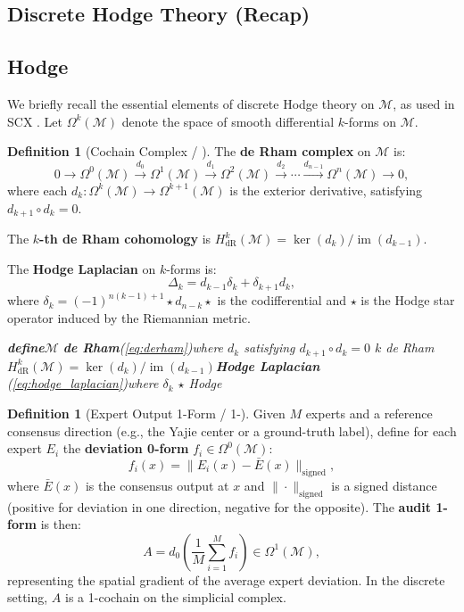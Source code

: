 \documentclass[11pt,a4paper]{article}
\theoremstyle{plain}
\theoremstyle{definition}
\newtheorem{definition}[theorem]{Definition}
\DeclareMathOperator{\im}{im}
\newcommand{\cM}{\mathcal{M}}
\begin{document}
\subsection{Discrete Hodge Theory (Recap)}
\subsection*{Hodge}

We briefly recall the essential elements of discrete Hodge theory on $\cM$, 
as used in SCX \cite{scx_hodge}. Let $\Omega^k(\cM)$ denote the space of 
smooth differential $k$-forms on $\cM$.

\begin{definition}[Cochain Complex / ]
The \textbf{de Rham complex} on $\cM$ is:
\begin{equation}
  0 \longrightarrow \Omega^0(\cM) \xrightarrow{d_0} \Omega^1(\cM) 
    \xrightarrow{d_1} \Omega^2(\cM) \xrightarrow{d_2} \cdots 
    \xrightarrow{d_{n-1}} \Omega^n(\cM) \longrightarrow 0,
  \label{eq:derham}
\end{equation}
where each $d_k: \Omega^k(\cM) \to \Omega^{k+1}(\cM)$ is the exterior 
derivative, satisfying $d_{k+1} \circ d_k = 0$.

The \textbf{$k$-th de Rham cohomology} is 
$H^k_{\text{dR}}(\cM) = \ker(d_k) / \im(d_{k-1})$.

The \textbf{Hodge Laplacian} on $k$-forms is:
\begin{equation}
  \Delta_k = d_{k-1} \delta_k + \delta_{k+1} d_k,
  \label{eq:hodge_laplacian}
\end{equation}
where $\delta_k = (-1)^{n(k-1)+1} \star d_{n-k} \star$ is the codifferential 
and $\star$ is the Hodge star operator induced by the Riemannian metric.
\end{definition}

\bigskip
\noindent
\textit{\textbf{define}$\cM$ \textbf{de Rham}(\ref{eq:derham})where $d_k$ satisfying $d_{k+1} \circ d_k = 0$ $k$ de Rham $H^k_{\text{dR}}(\cM) = \ker(d_k) / \im(d_{k-1})$\textbf{Hodge Laplacian} (\ref{eq:hodge_laplacian})where $\delta_k$ $\star$ Hodge}

\begin{definition}[Expert Output 1-Form / 1-]
Given $M$ experts and a reference consensus direction (e.g., the Yajie 
center or a ground-truth label), define for each expert $E_i$ the 
\textbf{deviation 0-form} $f_i \in \Omega^0(\cM)$:
\begin{equation}
  f_i(x) = \|E_i(x) - \bar{E}(x)\|_{\text{signed}},
  \label{eq:deviation}
\end{equation}
where $\bar{E}(x)$ is the consensus output at $x$ and $\|\cdot\|_{\text{signed}}$ 
is a signed distance (positive for deviation in one direction, negative for 
the opposite). The \textbf{audit 1-form} is then:
\begin{equation}
  A = d_0\left(\frac{1}{M}\sum_{i=1}^{M} f_i\right) \in \Omega^1(\cM),
  \label{eq:audit1form}
\end{equation}
representing the spatial gradient of the average expert deviation. In the 
discrete setting, $A$ is a 1-cochain on the simplicial complex.
\end{definition}
\end{document}
